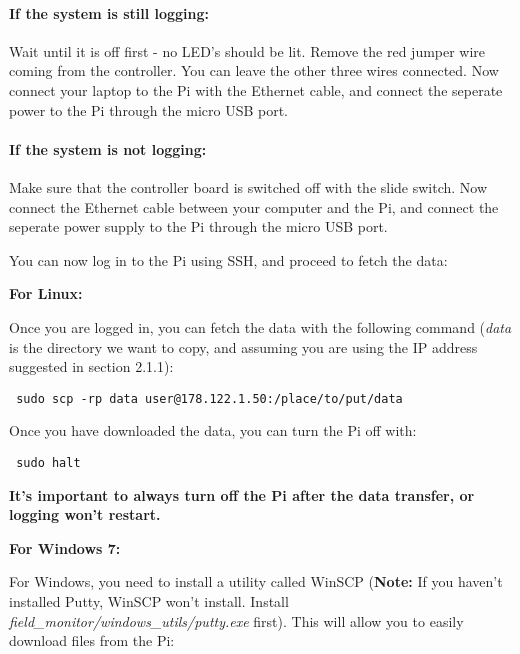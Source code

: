 \documentclass[10pt]{article}
\begin{document}
\paragraph{If the system is still logging:}
Wait until it is off first - no LED's should be lit. Remove the red jumper wire coming from the controller. You can leave the other three wires connected. Now connect your laptop to the Pi with the Ethernet cable, and connect the seperate power to the Pi through the micro USB port.

\paragraph{If the system is not logging:}
Make sure that the controller board is switched off with the slide switch. Now connect the Ethernet cable between your computer and the Pi, and connect the seperate power supply to the Pi through the micro USB port. \newline

You can now log in to the Pi using SSH, and proceed to fetch the data: \newline

\textbf{For Linux:} \newline

Once you are logged in, you can fetch the data with the following command (\textit{data} is the directory we want to copy, and assuming you are using the IP address suggested in section 2.1.1):

\begin{verbatim}
 sudo scp -rp data user@178.122.1.50:/place/to/put/data
\end{verbatim}

Once you have downloaded the data, you can turn the Pi off with:
\begin{verbatim}
 sudo halt
\end{verbatim}

\textbf{It's important to always turn off the Pi after the data transfer, or logging won't restart.} \newline

\textbf{For Windows 7:} \newline

For Windows, you need to install a utility called WinSCP (\textbf{Note:} If you haven't installed Putty, WinSCP won't install. Install \textit{field\_monitor/windows\_utils/putty.exe} first). This will allow you to easily download files from the Pi:
\end{document}

